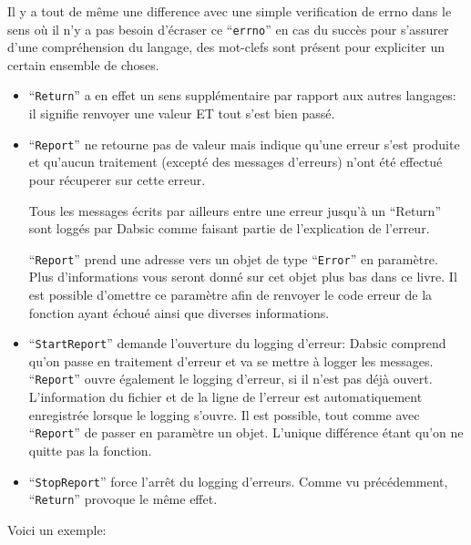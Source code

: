 \documentclass[a5paper, 12pt]{book}
\begin{document}
Il y a tout de même une difference avec une simple
verification de errno dans le sens où il n'y a pas
besoin d'écraser ce ``\verb!errno!'' en cas du succès pour
s'assurer d'une compréhension du langage, des mot-clefs
sont présent pour expliciter un certain ensemble de choses.

\begin{itemize}
  \item ``\verb!Return!'' a en effet un sens supplémentaire
    par rapport aux autres langages: il signifie renvoyer
    une valeur ET tout s'est bien passé.
    
  \item ``\verb!Report!'' ne retourne pas de valeur mais indique
    qu'une erreur s'est produite et qu'aucun traitement
    (excepté des messages d'erreurs) n'ont été effectué
    pour récuperer sur cette erreur.

    Tous les messages écrits par ailleurs entre une
    erreur jusqu'à un ``Return'' sont loggés par Dabsic
    comme faisant partie de l'explication de l'erreur.

    ``\verb!Report!'' prend une adresse vers un objet de type
    ``\verb!Error!'' en paramètre. Plus d'informations vous
    seront donné sur cet objet plus bas dans ce livre.
    Il est possible d'omettre ce paramètre afin de
    renvoyer le code erreur de la fonction ayant échoué
    ainsi que diverses informations.

  \item ``\verb!StartReport!'' demande l'ouverture du logging
    d'erreur: Dabsic comprend qu'on passe en traitement
    d'erreur et va se mettre à logger les messages.
    ``\verb!Report!'' ouvre également le logging d'erreur, si
    il n'est pas déjà ouvert.
    L'information du fichier et de la ligne de l'erreur
    est automatiquement enregistrée lorsque le logging
    s'ouvre.
    Il est possible, tout comme avec ``\verb!Report!'' de
    passer en paramètre un objet. L'unique différence
    étant qu'on ne quitte pas la fonction.
  \item ``\verb!StopReport!'' force l'arrêt du logging d'erreurs.
    Comme vu précédemment, ``\verb!Return!'' provoque le même
    effet.
\end{itemize}

Voici un exemple:\\
\end{document}
